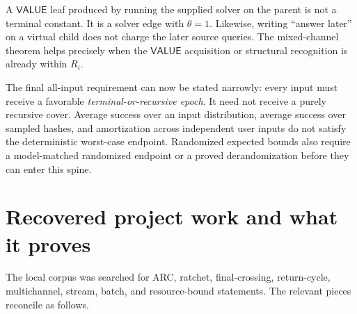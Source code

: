 \documentclass[11pt]{article}
\newcommand{\VALUE}{\mathsf{VALUE}}
\begin{document}
A \(\VALUE\) leaf produced by running the supplied solver on the parent is
not a terminal constant.  It is a solver edge with \(\theta=1\).  Likewise,
writing ``answer later'' on a virtual child does not charge the later source
queries.  The mixed-channel theorem helps precisely when the \(\VALUE\)
acquisition or structural recognition is already within \(R_i\).

The final all-input requirement can now be stated narrowly: every input must
receive a favorable \emph{terminal-or-recursive epoch}.  It need not receive
a purely recursive cover.  Average success over an input distribution,
average success over sampled hashes, and amortization across independent user
inputs do not satisfy the deterministic worst-case endpoint.  Randomized
expected bounds also require a model-matched randomized endpoint or a proved
derandomization before they can enter this spine.

\section{Recovered project work and what it proves}

The local corpus was searched for ARC, ratchet, final-crossing, return-cycle,
multichannel, stream, batch, and resource-bound statements.  The relevant
pieces reconcile as follows.
\end{document}
